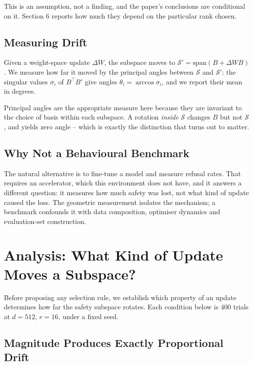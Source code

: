 \documentclass[10pt,twocolumn,letterpaper]{article}
\begin{document}
This is an assumption, not a finding, and the paper's conclusions are conditional on it. Section 6 reports how much they depend on the particular rank chosen.


\subsection{Measuring Drift}


Given a weight-space update $\Delta W$, the subspace moves to $\mathcal{S}' = \mathrm{span}(B + \Delta W B)$. We measure how far it moved by the principal angles between $\mathcal{S}$ and $\mathcal{S}'$: the singular values $\sigma_i$ of $B^{\top} B'$ give angles $\theta_i = \arccos \sigma_i$, and we report their mean in degrees.

Principal angles are the appropriate measure here because they are invariant to the choice of basis within each subspace. A rotation \textit{inside} $\mathcal{S}$ changes $B$ but not $\mathcal{S}$, and yields zero angle -- which is exactly the distinction that turns out to matter.


\subsection{Why Not a Behavioural Benchmark}


The natural alternative is to fine-tune a model and measure refusal rates. That requires an accelerator, which this environment does not have, and it answers a different question: it measures how much safety was lost, not what kind of update caused the loss. The geometric measurement isolates the mechanism; a benchmark confounds it with data composition, optimiser dynamics and evaluation-set construction.




\section{Analysis: What Kind of Update Moves a Subspace?}


Before proposing any selection rule, we establish which property of an update determines how far the safety subspace rotates. Each condition below is $400$ trials at $d = 512$, $r = 16$, under a fixed seed.


\subsection{Magnitude Produces Exactly Proportional Drift}
\end{document}
